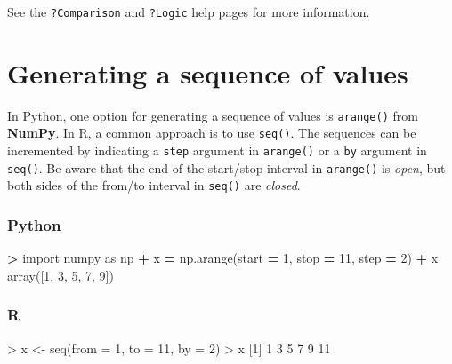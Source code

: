 \documentclass[
]{book}
\newenvironment{Shaded}{\begin{snugshade}}{\end{snugshade}}
\newcommand{\AttributeTok}[1]{\textcolor[rgb]{0.77,0.63,0.00}{#1}}
\newcommand{\DecValTok}[1]{\textcolor[rgb]{0.00,0.00,0.81}{#1}}
\newcommand{\FunctionTok}[1]{\textcolor[rgb]{0.00,0.00,0.00}{#1}}
\newcommand{\ImportTok}[1]{#1}
\newcommand{\NormalTok}[1]{#1}
\newcommand{\OperatorTok}[1]{\textcolor[rgb]{0.81,0.36,0.00}{\textbf{#1}}}
\newcommand{\OtherTok}[1]{\textcolor[rgb]{0.56,0.35,0.01}{#1}}
\newcommand{\SpecialCharTok}[1]{\textcolor[rgb]{0.00,0.00,0.00}{#1}}
\begin{document}
See the \texttt{?Comparison} and \texttt{?Logic} help pages for more information.

\hypertarget{generating-a-sequence-of-values}{%
\section{Generating a sequence of values}\label{generating-a-sequence-of-values}}

In Python, one option for generating a sequence of values is \texttt{arange()} from \textbf{NumPy}. In R, a common approach is to use \texttt{seq()}. The sequences can be incremented by indicating a \texttt{step} argument in \texttt{arange()} or a \texttt{by} argument in \texttt{seq()}. Be aware that the end of the start/stop interval in \texttt{arange()} is \emph{open}, but both sides of the from/to interval in \texttt{seq()} are \emph{closed}.

\hypertarget{python-5}{%
\subsubsection*{Python}\label{python-5}}

\begin{Shaded}
\begin{Highlighting}[]
\OperatorTok{\textgreater{}} \ImportTok{import}\NormalTok{ numpy }\ImportTok{as}\NormalTok{ np}
\OperatorTok{+}\NormalTok{ x }\OperatorTok{=}\NormalTok{ np.arange(start }\OperatorTok{=} \DecValTok{1}\NormalTok{, stop }\OperatorTok{=} \DecValTok{11}\NormalTok{, step }\OperatorTok{=} \DecValTok{2}\NormalTok{)}
\OperatorTok{+}\NormalTok{ x}
\NormalTok{array([}\DecValTok{1}\NormalTok{, }\DecValTok{3}\NormalTok{, }\DecValTok{5}\NormalTok{, }\DecValTok{7}\NormalTok{, }\DecValTok{9}\NormalTok{])}
\end{Highlighting}
\end{Shaded}

\hypertarget{r-5}{%
\subsubsection*{R}\label{r-5}}

\begin{Shaded}
\begin{Highlighting}[]
\SpecialCharTok{\textgreater{}}\NormalTok{ x }\OtherTok{\textless{}{-}} \FunctionTok{seq}\NormalTok{(}\AttributeTok{from =} \DecValTok{1}\NormalTok{, }\AttributeTok{to =} \DecValTok{11}\NormalTok{, }\AttributeTok{by =} \DecValTok{2}\NormalTok{)}
\SpecialCharTok{\textgreater{}}\NormalTok{ x}
\NormalTok{[}\DecValTok{1}\NormalTok{]  }\DecValTok{1}  \DecValTok{3}  \DecValTok{5}  \DecValTok{7}  \DecValTok{9} \DecValTok{11}
\end{Highlighting}
\end{Shaded}
\end{document}
